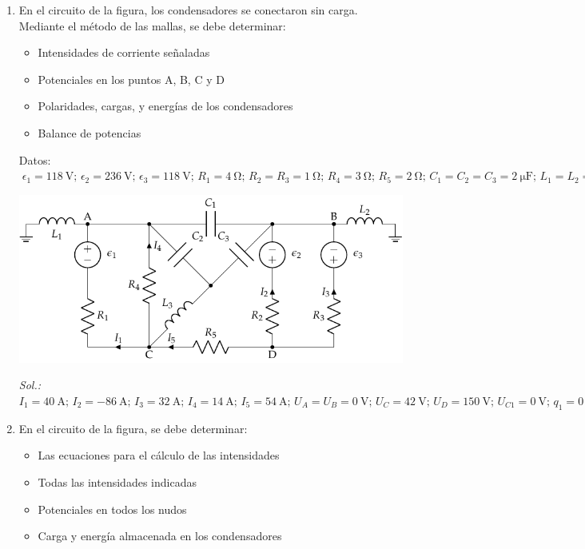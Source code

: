 \begin{enumerate}
\item En el circuito de la figura, los condensadores se conectaron sin
  carga. Mediante el método de las mallas, se debe determinar:
  \begin{itemize}
  \item Intensidades de corriente señaladas
  \item Potenciales en los puntos A, B, C y D
  \item Polaridades, cargas, y energías de los condensadores
  \item Balance de potencias
  \end{itemize}
  Datos:
  $\; \epsilon_{1}=\qty{118}{\volt};\, \epsilon_{2}=\qty{236}{\volt};\, \epsilon_{3}=\qty{118}{\volt};\,
  R_{1}= \qty{4}{\ohm};\, R_{2}=R_{3}=\qty{1}{\ohm};\, R_{4}= \qty{3}{\ohm};\,
  R_{5}=\qty{2}{\ohm};\, C_{1}=C_{2}=C_{3}=\qty{2}{\micro\farad};\, L_1 = L_2 = L_3 = \qty{1}{\milli\henry}$
  \begin{center}
    \includegraphics{../figs/mallas_condensadores.pdf}
  \end{center}

  \emph{Sol.:\;
    $I_1=\qty{40}{\ampere};\, I_2=\qty{-86}{\ampere};\, I_3=\qty{32}{\ampere};\, I_4=\qty{14}{\ampere};\, I_5=\qty{54}{\ampere};\, U_A=U_B=\qty{0}{\volt};\,
    U_C=\qty{42}{\volt};\, U_D=\qty{150}{\volt};\, U_{C1}=\qty{0}{\volt};\, q_1=\qty{0}{\coulomb};\, E_{C1}=\qty{0}{\joule};\, U_{C2}=\qty{-42}{\volt};\,
    q_2=\qty{84}{\micro\coulomb};\, E_{C2}=\qty{1.76}{\milli\joule};\, U_{C3}=\qty{-42}{\volt};\, q_3=\qty{84}{\micro\coulomb};\, E_{C3}=\qty{1.76}{\milli\joule};\, P_g = P_R$}


\item En el circuito de la figura, se debe determinar:
  \begin{itemize}
  \item Las ecuaciones para el cálculo de las intensidades
  \item Todas las intensidades indicadas
  \item Potenciales en todos los nudos
  \item Carga y energía almacenada en los condensadores
  \end{itemize}


\end{enumerate}
